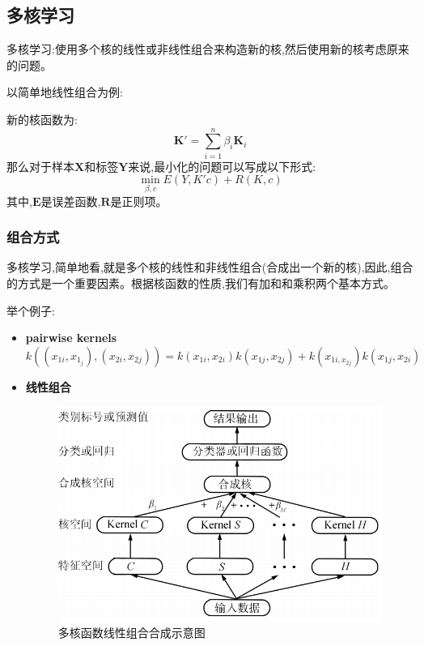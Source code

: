 \documentclass[UTF8,a4paper]{ctexart}
\begin{document}
        \subsection{多核学习}
            多核学习:使用多个核的线性或非线性组合来构造新的核,然后使用新的核考虑原来的问题。

            以简单地线性组合为例:

            新的核函数为:
            \begin{equation}
                \bm K' = \sum_{i = 1}^n \beta_i\bm K_i
            \end{equation}
            那么对于样本$\bm X$和标签$\bm Y$来说,最小化的问题可以写成以下形式:
            \begin{equation}
                \min_{\beta , c} E(Y,K'c) + R(K,c)
            \end{equation}
            其中,$\bm E$是误差函数,$\bm R$是正则项。

            \subsubsection{组合方式}
                多核学习,简单地看,就是多个核的线性和非线性组合(合成出一个新的核),因此,组合的方式是一个重要因素。根据核函数的性质,我们有加和和乘积两个基本方式。

                举个例子:
                \begin{itemize}
                    \item \textbf{pairwise kernels}
                    \begin{equation}
                        k((x_{1i},x_{1_j}) , (x_{2i},x_{2j})) = k(x_{1i} , x_{2i})k(x_{1j} , x_{2j}) + k(x_{1i,x_{2j}})k(x_{1j},x_{2i})
                    \end{equation}
                    \item \textbf{线性组合}
                    \begin{figure}[H]
                        \centering
                        \includegraphics[scale = 0.3]{assets/MultipleKernelLearning_96672.png}
                        \caption{多核函数线性组合合成示意图}
                    \end{figure}
                \end{itemize}
\end{document}
